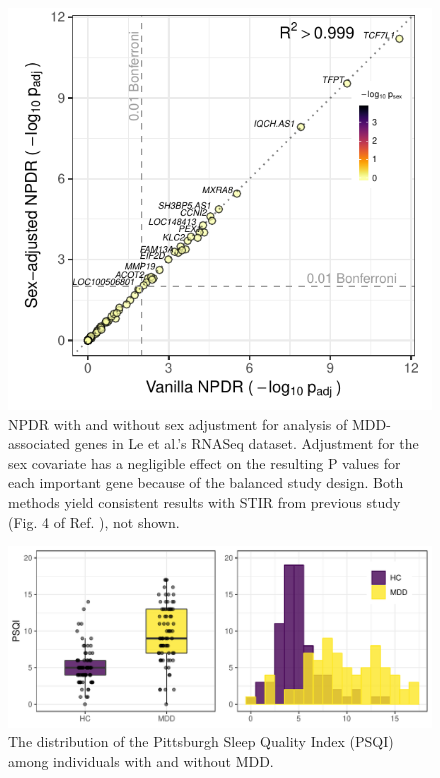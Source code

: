 \documentclass{article}
\begin{document}
\begin{figure}[h]%
\centerline{\includegraphics[]{../figs/jerzy_npdrs_mdd.pdf}}
\caption{NPDR with and without sex adjustment for analysis of MDD-associated genes in Le et al.'s RNASeq dataset. Adjustment for the sex covariate has a negligible effect on the resulting P values for each important gene because of the balanced study design. Both methods yield consistent results with STIR from previous study (Fig. 4 of Ref. \cite{stir}), not shown.}
\label{fig:jerzy_npdrs_mdd}
\end{figure}

\begin{figure}[h]%
\centerline{\includegraphics[]{../figs/psqi_plots.pdf}}
\caption{The distribution of the Pittsburgh Sleep Quality Index (PSQI) among individuals with and without MDD.}
\label{fig:psqi_plots}
\end{figure}



\end{document}
